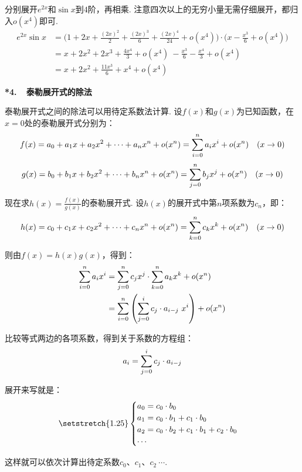 \begin{solution}
分别展开$e^{2x}$和$\sin x$到$4$阶，再相乘.
注意四次以上的无穷小量无需仔细展开，都归入$o(x^4)$即可.
\begin{equation}
    \begin{aligned}
        e^{2x} \sin x &= \bigg( 1 + 2x + \frac{(2x)^2}{2} + \frac{(2x)^3}{6} + \frac{(2x)^4}{24} + o(x^4)\bigg)
        \cdot \bigg( x - \frac{x^3}{6} + o(x^4) \bigg) \\
        &= x + 2x^2 + 2x^3 + \frac{4x^4}{3} + o(x^4) ~- \frac{x^3}{6} - \frac{x^4}{3} + o(x^4) \\
        &= x + 2x^2 + \frac{11x^3}{6} + x^4 + o(x^4)
        \nonumber
    \end{aligned}
\end{equation}
\end{solution}

\textbf{*4.~~泰勒展开式的除法} \par
泰勒展开式之间的除法可以用待定系数法计算. 设$f(x)$和$g(x)$为已知函数，在$x=0$处的泰勒展开式分别为：
$$
\setlength\abovedisplayskip{6pt}
\setlength\belowdisplayskip{6pt}
f(x) = a_0 +a_1 x +a_2 x^2 + \cdots + a_n x^n + o(x^{n}) = \sum_{i=0}^{n} a_i x^i +  o(x^{n}) ~~~(x \to 0)
$$
$$
\setlength\abovedisplayskip{6pt}
\setlength\belowdisplayskip{6pt}
g(x) = b_0 +b_1 x +b_2 x^2 + \cdots + b_n x^n + o(x^{n}) = \sum_{j=0}^{n} b_j x^j +  o(x^{n}) ~~~(x \to 0)
$$

现在求$h(x)=\frac{f(x)}{g(x)}$的泰勒展开式.
设$h(x)$的展开式中第$n$项系数为$c_n$，即：
$$
\setlength\abovedisplayskip{6pt}
    \setlength\belowdisplayskip{6pt}
h(x) = c_0 +c_1 x +c_2 x^2 + \cdots + c_n x^n + o(x^{n}) = \sum_{k=0}^{n} c_k x^k +  o(x^{n})~~~(x \to 0)
$$\par
则由$f(x) = h(x) g(x)$，得到：
\begin{equation}
    \setlength\abovedisplayskip{6pt}
    \setlength\belowdisplayskip{6pt}
    \begin{aligned}
        \sum_{i=0}^{n} a_i x^i &= \sum_{j=0}^{n} c_j x^j \cdot \sum_{k=0}^{n} a_k x^k  +o(x^{n}) \\
        &=\sum_{i=0}^{n}\left(  \sum_{j=0}^{i} c_j \cdot a_{i-j}~x^i  \right)  +o(x^{n})
        \nonumber
    \end{aligned}
\end{equation}\par
比较等式两边的各项系数，得到关于系数的方程组：
$$
\setlength\abovedisplayskip{6pt}
    \setlength\belowdisplayskip{6pt}
a_i =  \sum_{j=0}^{i} c_j \cdot a_{i-j}
$$\par
展开来写就是：
\[
\setstretch{1.25}
\begin{cases}
    a_0 = c_0 \cdot b_0 \\
    a_1 = c_0 \cdot b_1 + c_1 \cdot b_0 \\
    a_2 = c_0 \cdot b_2 + c_1 \cdot b_1 +c_2 \cdot b_0 \\
    \cdots
\end{cases}
\]  \par
这样就可以依次计算出待定系数$c_0$、$c_1$、$c_2~\cdots$.

